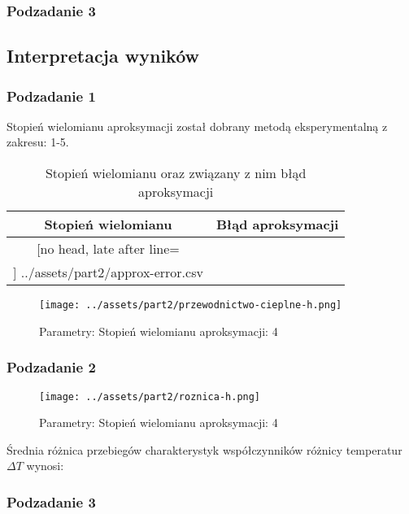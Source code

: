 \documentclass[
	12pt, %
]{fphw}
\begin{document}
\subsubsection{Podzadanie 3}


\newpage

\subsection{Interpretacja wyników}
\subsubsection{Podzadanie 1}
Stopień wielomianu aproksymacji został dobrany metodą eksperymentalną z zakresu: 1-5.

\begin{table}[H]
	\centering
	\begin{tabular}{|c|c|}\hline%
	Stopień wielomianu & Błąd aproksymacji \\\hline
	\csvreader[no head, late after line=\\\hline]%
	{../assets/part2/approx-error.csv}{}%
	{\thecsvrow&\csvcoli}%
	\end{tabular}
	\caption{Stopień wielomianu oraz związany z nim błąd aproksymacji}
	\label{tab:approx-error}
\end{table}

\begin{figure}[H]
	\texttt{[image: ../assets/part2/przewodnictwo-cieplne-h.png]}
	\caption{Parametry: Stopień wielomianu aproksymacji: 4}
	\label{fig:przewodnictwo-h}
\end{figure}

\subsubsection{Podzadanie 2}
\begin{figure}[H]
	\texttt{[image: ../assets/part2/roznica-h.png]}
	\caption{Parametry: Stopień wielomianu aproksymacji: 4}
	\label{fig:roznica-h}
\end{figure}

Średnia różnica przebiegów charakterystyk współczynników
różnicy temperatur \(\Delta T\) wynosi:
%
{\csvcoli}%

\newpage

\subsubsection{Podzadanie 3}
\end{document}

